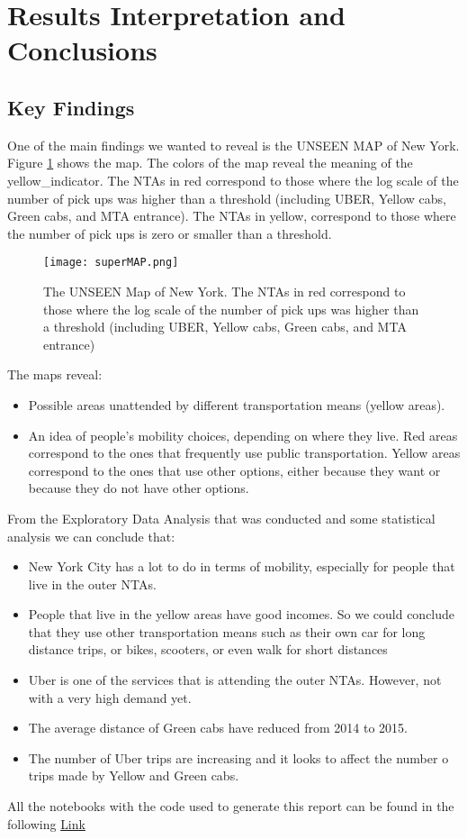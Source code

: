 \section{Results Interpretation and Conclusions}
\label{sec:results}

\subsection{Key Findings}

One of the main findings we wanted to reveal is the UNSEEN MAP of New York. Figure \ref{fig:maxMapTotalPickDrop} shows the map. The colors of the map reveal the meaning of the yellow\_indicator. The NTAs in red correspond to those where the log scale of the number of pick ups was higher than a threshold (including UBER, Yellow cabs, Green cabs, and MTA entrance). The NTAs in yellow, correspond to those where the number of pick ups is zero or smaller than a threshold.

\begin{figure}%
\centering
\texttt{[image: superMAP.png]}
\caption{The UNSEEN Map of New York. The NTAs in red correspond to those where the log scale of the number of pick ups was higher than a threshold (including UBER, Yellow cabs, Green cabs, and MTA entrance)}
\label{fig:maxMapTotalPickDrop}%
\end{figure}


The maps reveal:

\begin{itemize}
\item  Possible areas unattended by different transportation means (yellow areas).
\item  An idea of people's mobility choices, depending on where they live. Red areas correspond to the ones that frequently use public transportation. Yellow areas correspond to the ones that use other options, either because they want or because they do not have other options.
\end{itemize}


From the Exploratory Data Analysis that was conducted and some statistical analysis we can conclude that:

\begin{itemize}
\item New York City has a lot to do in terms of mobility, especially for people that live in the outer NTAs. 
\item  People that live in the yellow areas have good incomes. So we could conclude that they use other transportation means such as their own car for long distance trips, or bikes, scooters, or even walk for short distances
\item Uber is one of the services that is attending the outer NTAs. However, not with a very high demand yet. 
\item The average distance of Green cabs have reduced from 2014 to 2015.  
\item The number of Uber trips are increasing and it looks to affect the number o trips made by Yellow and Green cabs.

\end{itemize}

All the notebooks with the code used to generate this report can be found in the following 
\href{https://github.com/jssalamanca1967/ds4a_datathon_group03}{Link}